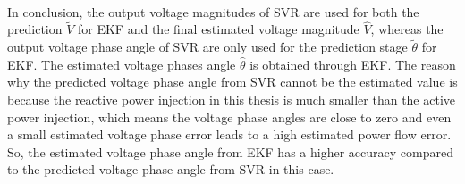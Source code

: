 \\In conclusion, the output voltage magnitudes of SVR are used for both the prediction $\widetilde{V}$ for EKF and the final estimated voltage magnitude $\hat{V}$, whereas the output voltage phase angle of SVR are only used for the prediction stage $\widetilde{\theta}$ for EKF. The estimated voltage phases angle $\hat{\theta}$ is obtained through EKF. The reason why the predicted voltage phase angle from SVR cannot be the estimated value is because the reactive power injection in this thesis is much smaller than the active power injection, which means the voltage phase angles are close to zero and even a small estimated voltage phase error leads to a high estimated power flow error. So, the estimated voltage phase angle from EKF has a higher accuracy compared to the predicted voltage phase angle from SVR in this case.


\newpage